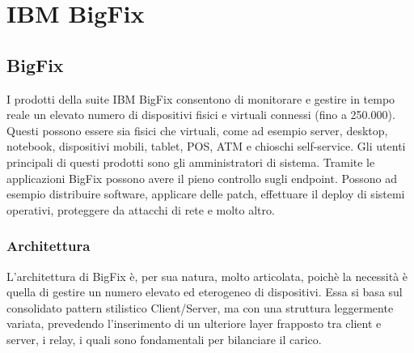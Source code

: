 \chapter{IBM BigFix}

\section{BigFix}
I prodotti della suite IBM BigFix consentono di monitorare e gestire in tempo reale un elevato numero di dispositivi fisici e virtuali connessi (fino a 250.000). Questi possono essere sia fisici che virtuali, come ad esempio server, desktop, notebook, dispositivi mobili, tablet, POS, ATM e chioschi self-service. Gli utenti principali di questi prodotti sono gli amministratori di sistema. Tramite le applicazioni BigFix possono avere il pieno controllo sugli endpoint. Possono ad esempio distribuire software, applicare delle patch, effettuare il deploy di sistemi operativi, proteggere da attacchi di rete e molto altro.
\subsection{Architettura}
L'architettura di BigFix è, per sua natura, molto articolata, poichè la necessità è quella di gestire un numero elevato ed eterogeneo di dispositivi. Essa si basa sul consolidato pattern stilistico Client/Server, ma con una struttura leggermente variata, prevedendo l'inserimento di un ulteriore layer frapposto tra client e server, i relay, i quali sono fondamentali per bilanciare il carico.

